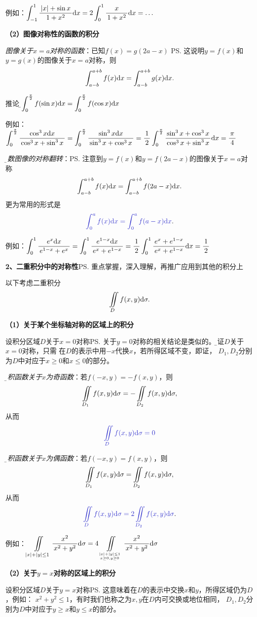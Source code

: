例如：$\displaystyle\int_{-1}^{1}\displaystyle\frac{\,{|x|+\sin x}\,}{\,{1+x^2}\,}\mathrm{d} x
=2\displaystyle\int_0^{1}\displaystyle\frac{\,{x}\,}{\,{1+x^2}\,}\mathrm{d} x=\ldots$

{\bf （2）图像对称性的函数的积分}

{\it 图像关于$x=a$对称的函数}：已知$f(x)=g(2a-x)$
\ps{这说明$y=f(x)$和$y=g(x)$的图像关于$x=a$对称}，则
$$\int_{a-b}^{a+b}f(x)\mathrm{d} x=\int_{a-b}^{a+b}g(x)\mathrm{d} x.$$

推论：{\b $\displaystyle\int_0^{\frac{\pi}2}f(\sin x)\mathrm{d} x=\displaystyle\int_0^{\frac{\pi}2}f(\cos x)\mathrm{d} x$}

例如：$\displaystyle\int_0^{\frac{\pi}2}\displaystyle\frac{\,{\cos^3x\mathrm{d} x}\,}{\,{\cos^3x+\sin^3x}\,}
=\displaystyle\int_0^{\frac{\pi}2}\displaystyle\frac{\,{\sin^3x\mathrm{d} x}\,}{\,{\sin^3x+\cos^3x}\,}
=\displaystyle\frac{\,{1}\,}{\,{2}\,}\displaystyle\int_0^{\frac{\pi}2}\displaystyle\frac{\,{\sin^3x+\cos^3x}\,}{\,{\cos^3x+\sin^3x}\,}\mathrm{d} x=\displaystyle\frac{\,{\pi}\,}{\,{4}\,}$

{\it\b 函数图像的对称翻转}：\ps{注意到$y=f(x)$和$y=f(2a-x)$的图像关于$x=a$对称}
$$\int_{a-b}^{a+b}f(x)\mathrm{d} x=\int_{a-b}^{a+b}f(2a-x)\mathrm{d} x.$$
更为常用的形式是
$${\b \int_0^af(x)\d x=\int_0^af(a-x)\d x}.$$

例如：$\displaystyle\int_0^1\displaystyle\frac{\,{e^x\mathrm{d} x}\,}{\,{e^{1-x}+e^x}\,}
=\displaystyle\int_0^1\displaystyle\frac{\,{e^{1-x}\mathrm{d} x}\,}{\,{e^x+e^{1-x}}\,}
=\displaystyle\frac{\,{1}\,}{\,{2}\,}\displaystyle\int_0^1\displaystyle\frac{\,{e^x+e^{1-x}}\,}{\,{e^x+e^{1-x}}\,}\mathrm{d} x=\displaystyle\frac{\,{1}\,}{\,{2}\,}$

\bigskip

{\bf 2、二重积分中的对称性}\ps{重点掌握，深入理解，再推广应用到其他的积分上}

以下考虑二重积分
$$\displaystyle\iint\limits_Df(x,y)\mathrm{d}\sigma.$$

{\bf（1）关于某个坐标轴对称的区域上的积分}

设积分区域$D$关于$x=0$对称\ps{关于$y=0$对称的相关结论是类似的。\b 验证$D$关于$x=0$对称，只需
在$D$的表示中用$-x$代换$x$，若所得区域不变，即证}，
$D_1,D_2$分别为$D$中对应于$x\geq0$和$x\leq0$的部分。

{\it\b 被积函数关于$x$为奇函数}：若$f(-x,y)=-f(x,y)$，则
$$\displaystyle\iint\limits_{D_1}f(x,y)\mathrm{d}\sigma=-\displaystyle\iint\limits_{D_2}f(x,y)\mathrm{d}\sigma,$$
从而
$${\b \ds\iint\limits_{D}f(x,y)\d\sigma=0}$$

{\it\b 被积函数关于$x$为偶函数}：若$f(-x,y)=f(x,y)$，则
$$\displaystyle\iint\limits_{D_1}f(x,y)\mathrm{d}\sigma=\displaystyle\iint\limits_{D_2}f(x,y)\mathrm{d}\sigma,$$
从而
$${\b\ds\iint\limits_{D}f(x,y)\d\sigma=2\ds\iint\limits_{D_2}f(x,y)\d\sigma}.$$

例如：$\displaystyle\iint\limits_{|x|+|y|\leq1}\displaystyle\frac{\,{x^2}\,}{\,{x^2+y^2}\,}\mathrm{d}\sigma
=4\displaystyle\iint\limits_{|x|+|y|\leq1\atop{x\geq0,y\geq0}}\displaystyle\frac{\,{x^2}\,}{\,{x^2+y^2}\,}
\mathrm{d}\sigma$

{\bf（2）关于$y=x$对称的区域上的积分}

设积分区域$D$关于$y=x$对称\ps{这意味着在$D$的表示中交换$x$和$y$，所得区域仍为$D$，例如：
$x^2+y^2\leq 1$，有时我们也称之为$x,y$在$D$内可交换或地位相同}，
$D_1,D_2$分别为$D$中对应于$y\geq x$和$y\leq x$的部分。


